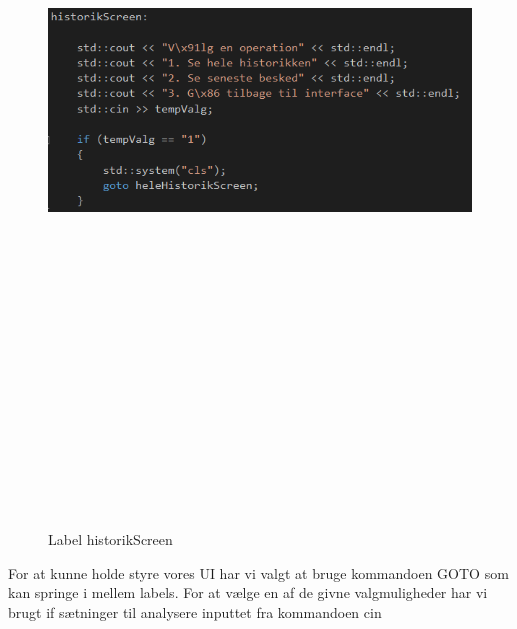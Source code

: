 \begin{figure}[ht]
	\centering
	\includegraphics[width=12cm,height=22cm,keepaspectratio]{pictures/historik.PNG}
	\caption{Label historikScreen}
	\label{fig:historik}
\end{figure}
For at kunne holde styre vores UI har vi valgt at bruge kommandoen GOTO som kan springe i mellem labels. For at vælge en af de givne valgmuligheder har vi brugt if sætninger til analysere inputtet fra kommandoen cin
